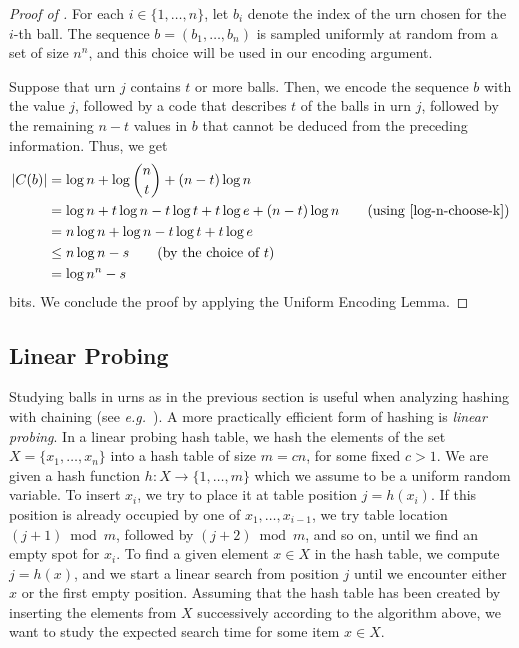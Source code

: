 \documentclass[prodmode,acmcsur]{acmsmall}
\begin{document}
\begin{proof}[Proof of ]
  For each $i\in\{1,\ldots,n\}$, let $b_i$ denote the index of the urn
  chosen for the $i$-th ball. The sequence $b = (b_1,\ldots,b_n)$ is
  sampled uniformly at random from a set of size $n^n$, and this
  choice will be used in our encoding argument.

  Suppose that urn $j$ contains $t$ or more balls. Then,
  we encode the sequence $b$
  with the value $j$, followed by a code that describes $t$ of
  the balls in urn $j$, followed by the remaining $n-t$ values in
  $b$ that cannot be deduced from the preceding
  information.  Thus, we get
  \begin{align*}
    |C(b)| &= \log n + \log\binom{n}{t} + (n-t)\log n \\
           &= \log n + t\log n - t\log t + t\log e + (n-t)\log n
             \tag{using \eqref{log-n-choose-k}} \\
           & = n \log n + \log n - t\log t + t\log e \\
           & \le n \log n - s \tag{by the choice of $t$} \\
           & = \log n^n - s
  \end{align*}
  bits. We conclude the proof by applying the Uniform Encoding Lemma.
\end{proof}

\subsection{Linear Probing}

Studying balls in urns as in the previous section is useful when 
analyzing hashing with chaining
(see \emph{e.g.}~\cite[Section~5.1]{morin:open}). A more practically
efficient form of hashing is \emph{linear probing}.  In a linear
probing hash table, we hash the elements of the set
$X = \{x_1, \ldots, x_n\}$ into a hash table of size $m=cn$, for some
fixed $c> 1$. We are given a hash function
$h : X \to \{1, \ldots, m\}$ which we assume to be a uniform random
variable. To insert $x_i$, we try to place it at table position
$j=h(x_i)$. If this position is already occupied by one of
$x_1,\ldots,x_{i-1}$, we try table location
$(j+1)\bmod m$, followed by $(j+2)\bmod m$, and so on, until 
we find an empty spot
for $x_i$.  
To find a given element $x \in X$ in the hash table, we compute
$j = h(x)$, and we start a linear search from position $j$ 
until we encounter either $x$ or the first empty position.
Assuming that the hash table has been created by inserting
the elements from $X$ successively according to the
algorithm above, 
we want to study the expected search time for some item
$x \in X$.
\end{document}

